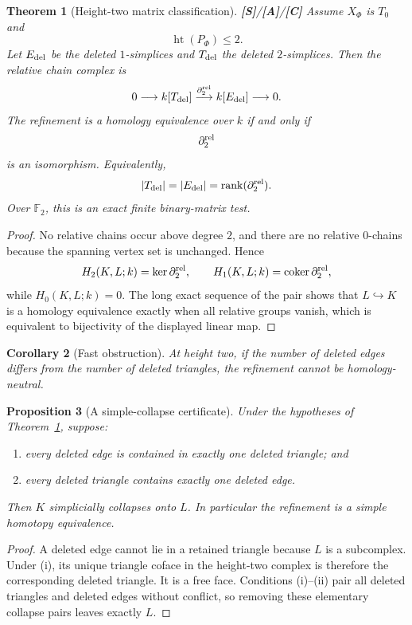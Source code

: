 \documentclass[11pt]{article}
\newtheorem{theorem}{Theorem}[section]
\newtheorem{proposition}[theorem]{Proposition}
\newtheorem{corollary}[theorem]{Corollary}
\theoremstyle{definition}
\newcommand{\F}{\mathbb F_2}
\newcommand{\rank}{\operatorname{rank}}
\newcommand{\statusS}{\textbf{[S]}}
\newcommand{\statusA}{\textbf{[A]}}
\newcommand{\statusC}{\textbf{[C]}}
\begin{document}
\begin{theorem}[Height-two matrix classification]\label{thm:height2}
\statusS/\statusA/\statusC\;
Assume $X_\Phi$ is $T_0$ and
\[
\operatorname{ht}(P_\Phi)\le2.
\]
Let $E_{\rm del}$ be the deleted $1$-simplices and $T_{\rm del}$ the deleted $2$-simplices. Then the relative chain complex is
\[
0\longrightarrow k[T_{\rm del}]
\overset{\partial_2^{\rm rel}}{\longrightarrow}
k[E_{\rm del}]
\longrightarrow0.
\]
The refinement is a homology equivalence over $k$ if and only if
\[
\partial_2^{\rm rel}
\]
is an isomorphism. Equivalently,
\[
|T_{\rm del}|=|E_{\rm del}|=\rank(\partial_2^{\rm rel}).
\]
Over $\F$, this is an exact finite binary-matrix test.
\end{theorem}

\begin{proof}
No relative chains occur above degree $2$, and there are no relative $0$-chains because the spanning vertex set is unchanged. Hence
\[
H_2(K,L;k)=\ker\partial_2^{\rm rel},\qquad
H_1(K,L;k)=\operatorname{coker}\partial_2^{\rm rel},
\]
while $H_0(K,L;k)=0$. The long exact sequence of the pair shows that $L\hookrightarrow K$ is a homology equivalence exactly when all relative groups vanish, which is equivalent to bijectivity of the displayed linear map.
\end{proof}

\begin{corollary}[Fast obstruction]
At height two, if the number of deleted edges differs from the number of deleted triangles, the refinement cannot be homology-neutral.
\end{corollary}

\begin{proposition}[A simple-collapse certificate]\label{prop:collapsepair}
Under the hypotheses of Theorem~\ref{thm:height2}, suppose:
\begin{enumerate}[label=(\roman*)]
\item every deleted edge is contained in exactly one deleted triangle; and
\item every deleted triangle contains exactly one deleted edge.
\end{enumerate}
Then $K$ simplicially collapses onto $L$. In particular the refinement is a simple homotopy equivalence.
\end{proposition}

\begin{proof}
A deleted edge cannot lie in a retained triangle because $L$ is a subcomplex. Under (i), its unique triangle coface in the height-two complex is therefore the corresponding deleted triangle. It is a free face. Conditions (i)--(ii) pair all deleted triangles and deleted edges without conflict, so removing these elementary collapse pairs leaves exactly $L$.
\end{proof}
\end{document}
